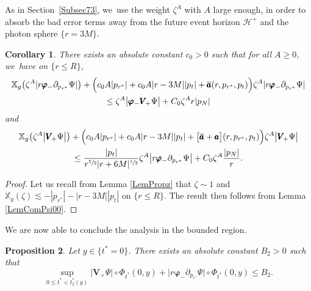 \documentclass[JEP,XML,SOM,Unicode,published]{cedram}
\theoremstyle{plain}
\newtheorem{proposition}{Proposition}[section]
\newtheorem{corollary}[proposition]{Corollary}
\theoremstyle{definition}
\newcommand\T{{\mathbb{X}}}
\renewcommand\H{{\mathcal{H}^+}}
\begin{document}
As in Section~\ref{Subsec73}, we~use the weight $\zeta^A$ with $A$ large enough, in order to absorb the bad error terms away from the future event horizon $\H$ and the photon sphere $\{ r=3M \}$.

\begin{corollary}\label{CorComBounded}
There exists an absolute constant $c_0>0$ such that for all $A \geq 0$, we~have on $\{ r \leq R \}$,
\begin{multline*}
\T_g \bigl(\zeta^A| r \pmb{\varphi}_- \partial_{p_{r^*}} \Psi| \bigr) +\Bigl(c_0A |p_{r^*}|+c_0A|r-3M||p_t|+\overline{\pmb{a}}(r,p_{r^*},p_t) \Bigr) \zeta^A|r \pmb{\varphi}_- \partial_{p_{r^*}} \Psi| \\
\leq \zeta^A \big| \pmb{\varphi}_- \pmb{V}_{\! +} \Psi \big|+C_0\zeta^A r|p_N|
\end{multline*}
and
\begin{multline*}
\T_g \bigl(\zeta^A \big| \pmb{V}_{\! +} \Psi \big| \bigr) + \Bigl(c_0A |p_{r^*}|+c_0A|r-3M||p_t|+ \bigl[\overline{\pmb{a}}+\pmb{a} \bigr](r,p_{r^*},p_t)\Bigr) \zeta^A \big| \pmb{V}_{\! +} \Psi \big| \\
\leq \frac{|p_t|}{r^{\sfrac{5}{2}}|r+6M|^{\sfrac{1}{2}}}\zeta^A\big| r \pmb{\varphi}_- \partial_{p_{r^*}}\Psi \big|+C_0\zeta^A\frac{|p_N|}{r}.
\end{multline*}
\end{corollary}

\begin{proof}
Let us recall from Lemma \ref{LemPropz} that $\zeta \sim 1$ and $\T_g(\zeta)\lesssim -|p_{r^*}|-|r-3M||p_t|$ on $\{ r \leq R \}$. The result then follows from Lemma \ref{LemComPsi00}.
\end{proof}

We are now able to conclude the analysis in the bounded region.

\begin{proposition}\label{ProboundedPsi}
Let $y \in \{ t^*=0 \}$. There exists an absolute constant $B_2>0$ such that
\[
\sup_{0 \leq t^* < t^*_2(y)} \big| \pmb{V}_{\! +}\Psi \big|\circ \Phi_{t^*}(0,y)+\big|r \pmb{\varphi}_- \partial_{p_{r^*}} \Psi \big|\circ \Phi_{t^*}(0,y) \leq B_2.
\]
\end{proposition}
\end{document}
